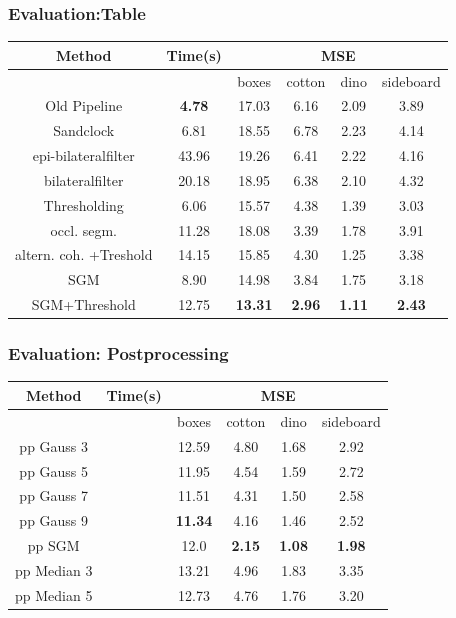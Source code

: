 \documentclass[11pt]{beamer}
\begin{document}
\begin{frame}
	\frametitle{Evaluation:Table}
	\begin{table}
		\begin{tabular}{|c|c|c|c|c|c|}
			\hline 
			Method & Time(s)  & \multicolumn{4}{c|}{MSE} \\ 
			\hline 
			&  & boxes & cotton & dino & sideboard \\ 
			\hline
			Old Pipeline &\textbf{ 4.78} & 17.03 & 6.16 & 2.09 & 3.89 \\
			\hline 
			Sandclock & 6.81  & 18.55  & 6.78  & 2.23  & 4.14 \\ 
			\hline 
			epi-bilateralfilter &  43.96 &  19.26  & 6.41  & 2.22  & 4.16  \\ 
			\hline 
			bilateralfilter & 20.18  & 18.95  &  6.38 & 2.10  &4.32  \\ 
			\hline 
			Thresholding  & 6.06 & 15.57  & 4.38  & 1.39  & 3.03  \\ 
			\hline 
			occl. segm. & 11.28  & 18.08 &  3.39 & 1.78  & 3.91  \\ 
			\hline 
			altern. coh. +Treshold & 14.15  & 15.85  & 4.30  & 1.25  & 3.38  \\ 
			\hline 
			SGM& 8.90 & 14.98  & 3.84  & 1.75  & 3.18  \\ 
			\hline 
			SGM+Threshold & 12.75  & \textbf{13.31}  &\textbf{ 2.96}   &\textbf{ 1.11}   & \textbf{2.43} \\ 
			\hline 
			\hline
					\end{tabular} 
		\end{table}
	\end{frame}
\begin{frame}
\frametitle{Evaluation: Postprocessing}
\begin{table}
	\begin{tabular}{|c|c|c|c|c|c|}
		\hline 
		Method & Time(s)  & \multicolumn{4}{c|}{MSE} \\ 
		\hline 
		&  & boxes & cotton & dino & sideboard \\ 
		\hline
			pp Gauss 3 & & 12.59 & 4.80 & 1.68 & 2.92 \\
			\hline
			pp Gauss 5 & & 11.95 & 4.54 & 1.59 &  2.72 \\
			\hline 
			pp Gauss 7 & & 11.51 & 4.31 & 1.50 & 2.58 \\
			\hline
			pp Gauss 9 & &\textbf{ 11.34} & 4.16 & 1.46 & 2.52 \\
			\hline
			pp SGM & &12.0 & \textbf{2.15} &\textbf{ 1.08} & \textbf{1.98}\\
			\hline
			pp Median 3 & & 13.21 & 4.96 & 1.83 & 3.35 \\
			\hline
			pp Median 5 & & 12.73 & 4.76 & 1.76 & 3.20 \\
			\hline
		\end{tabular} 
	\end{table}
\end{frame}
\end{document}
